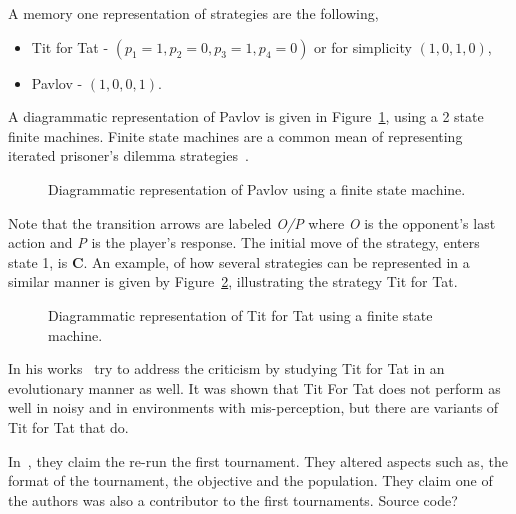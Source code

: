 \documentclass{article}
\begin{document}
A memory one representation of strategies are the following, 

\begin{itemize}
	\item Tit for Tat - \((p_1=1, p_2=0, p_3=1, p_4=0)\) or for simplicity 
	\((1, 0, 1, 0)\),
	\item Pavlov - \((1, 0, 0, 1)\).
\end{itemize}

A diagrammatic representation of Pavlov is given in Figure~\ref{fig:pavlov_fsm},
using a 2 state finite machines.  Finite state machines are a common mean of representing
iterated prisoner's dilemma strategies~\cite{Rubinstein1986, Miller1996}. 

\begin{figure}[!hbtp]
    \centering
    
    \caption{Diagrammatic representation of Pavlov using a finite state machine.}
    \label{fig:pavlov_fsm}
\end{figure}

Note that the transition arrows are labeled \textit{O/P} where \textit{O} is the 
opponent’s last action and \textit{P} is the player’s response. 
The initial move of the strategy, enters state 1, is \textbf{C}. An example,
of how several strategies can be represented in a similar manner is given
by Figure~\ref{fig:tit_for_tat_fsm}, illustrating the strategy Tit for Tat.

\begin{figure}[!hbtp]
    \centering
    
    \caption{Diagrammatic representation of Tit for Tat using a finite state machine.}
    \label{fig:tit_for_tat_fsm}
\end{figure}

In his works~\cite{axelrod1988} try to address the criticism by studying Tit for 
Tat in an evolutionary manner as well. It was shown that Tit For Tat does not 
perform as well in noisy and in environments with mis-perception, but there are 
variants of Tit for Tat that do.

In~\cite{Rapoport2015}, they claim the re-run the first tournament. 
They altered aspects such as, the format of the tournament, the objective
and the population. They claim one of the authors was also a contributor to
the first tournaments. Source code? 



\end{document}
